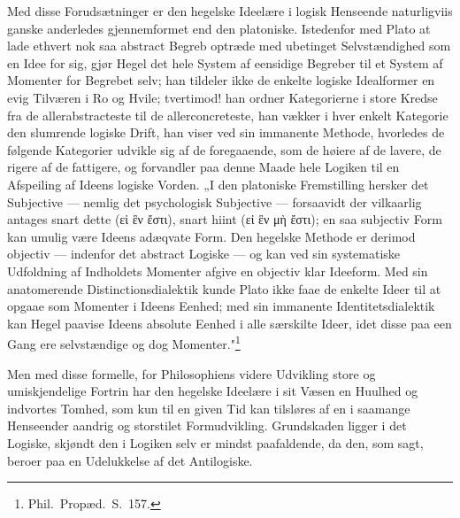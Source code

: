 \documentclass[12pt]{book}
\newcommand{\opage}[1]{\marginnote{\footnotesize\textit{[#1]}}}
\begin{document}
Med disse Forudsætninger er den hegelske Ideelære i logisk Henseende naturligviis ganske
anderledes gjennemformet end den platoniske. Istedenfor med Plato at lade ethvert nok saa
abstract Begreb optræde med ubetinget Selvstændighed som en Idee for sig, gjør Hegel det hele
System af eensidige Begreber til et System af Momenter for Begrebet selv; han tildeler ikke de
enkelte logiske Idealformer en evig Tilværen i Ro og Hvile; tvertimod! han ordner Kategorierne i
store Kredse fra de allerabstracteste til de allerconcreteste, han vækker i hver enkelt Kategorie
den slumrende logiske Drift, han viser ved sin immanente Methode, hvorledes de følgende
Kategorier udvikle sig af de foregaaende, som de høiere af de lavere, de rigere af de fattigere,
og forvandler paa denne Maade hele Logiken til en Afspeiling af Ideens logiske Vorden. „I den
platoniske Fremstilling hersker det Subjective --- nemlig det psychologisk Subjective ---
forsaavidt der vilkaarlig antages snart dette (εἰ ἓν ἔστι), snart hiint (εἰ ἓν μὴ ἔστι); en saa
subjectiv Form kan umulig være Ideens adæqvate Form. Den
\opage{187} hegelske Methode er derimod objectiv --- indenfor det abstract Logiske --- og kan ved sin
systematiske Udfoldning af Indholdets Momenter afgive en objectiv klar Ideeform. Med sin
anatomerende Distinctionsdialektik kunde Plato ikke faae de enkelte Ideer til at opgaae som
Momenter i Ideens Eenhed; med sin immanente Identitetsdialektik kan Hegel paavise Ideens absolute
Eenhed i alle særskilte Ideer, idet disse paa een Gang ere selvstændige og dog
Momenter."\footnote{Phil.\ Propæd.\ S.~157.}

Men med disse formelle, for Philosophiens videre Udvikling store og umiskjendelige Fortrin har
den hegelske Ideelære i sit Væsen en Huulhed og indvortes Tomhed, som kun til en given Tid kan
tilsløres af en i saamange Henseender aandrig og storstilet Formudvikling. Grundskaden ligger i
det Logiske, skjøndt den i Logiken selv er mindst paafaldende, da den, som sagt, beroer paa en
Udelukkelse af det Antilogiske.
\end{document}
